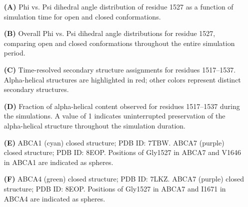 \documentclass[12pt]{article}
\begin{document}
    \begin{itemize}
        \item[\textbf{(A)}] Phi vs. Psi dihedral angle distribution of residue 1527 as a function of simulation time for open and closed conformations.
        \item[\textbf{(B)}] Overall Phi vs. Psi dihedral angle distributions for residue 1527, comparing open and closed conformations throughout the entire simulation period.
        \item[\textbf{(C)}] Time-resolved secondary structure assignments for residues 1517–1537. Alpha-helical structures are highlighted in red; other colors represent distinct secondary structures.
        \item[\textbf{(D)}] Fraction of alpha-helical content observed for residues 1517–1537 during the simulations. A value of 1 indicates uninterrupted preservation of the alpha-helical structure throughout the simulation duration.
        \item[\textbf{(E)}] ABCA1 (cyan) closed structure; PDB ID: 7TBW. ABCA7 (purple) closed structure; PDB ID: 8EOP. Positions of Gly1527 in ABCA7 and V1646 in ABCA1 are indicated as spheres.
        \item[\textbf{(F)}] ABCA4 (green) closed structure; PDB ID: 7LKZ. ABCA7 (purple) closed structure; PDB ID: 8EOP. Positions of Gly1527 in ABCA7 and I1671 in ABCA4 are indicated as spheres.

    \end{itemize}
\end{document}
